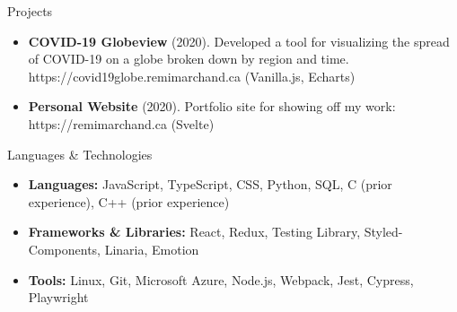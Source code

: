 \documentclass[]{mcdowellcv}
\begin{document}
	\begin{cvsection}{Projects}
		\begin{cvsubsection}{}{}{}
			\begin{itemize}
				\item \textbf{COVID-19 Globeview} (2020). Developed a tool for visualizing the spread of COVID-19 on a globe broken down by region and time.
					https://covid19globe.remimarchand.ca (Vanilla.js, Echarts)
				\item \textbf{Personal Website} (2020). Portfolio site for showing off my work: https://remimarchand.ca (Svelte)
			\end{itemize}
		\end{cvsubsection}
	\end{cvsection}

	\begin{cvsection}{Languages \& Technologies}
		\begin{cvsubsection}{}{}{}
			\begin{itemize}
				\item \textbf{Languages:} JavaScript, TypeScript, CSS, Python, SQL, C (prior experience), C++ (prior experience)
				\item \textbf{Frameworks \& Libraries:} React, Redux, Testing Library, Styled-Components, Linaria, Emotion
				\item \textbf{Tools:} Linux, Git, Microsoft Azure, Node.js, Webpack, Jest, Cypress, Playwright
			\end{itemize}
		\end{cvsubsection}
	\end{cvsection}
\end{document}
